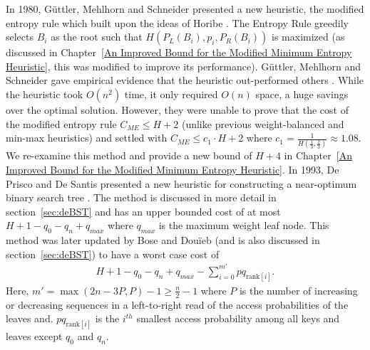 \documentclass[]{beamer}
\theoremstyle{plain}
\begin{document}
\begin{frame}
  In 1980, G{\"u}ttler, Mehlhorn and Schneider presented a new heuristic, the modified entropy rule \cite{guttler1980binary} which built upon the ideas of Horibe \cite{horibe1977improved}. The Entropy Rule greedily selects $B_i$ as the root such that $H(P_L(B_i), p_i, P_R(B_i))$ is maximized (as discussed in Chapter~\ref{An Improved Bound for the Modified Minimum Entropy Heuristic}, this was modified to improve its performance). G{\"u}ttler, Mehlhorn and Schneider gave empirical evidence that the heuristic out-performed others \cite{guttler1980binary}. While the heuristic took $O(n^2)$ time, it only required $O(n)$ space, a huge savings over the optimal solution. However, they were unable to prove that the cost of the modified entropy rule $C_{ME} \leq H+2$ (unlike previous weight-balanced and min-max heuristics) and settled with $C_{ME} \leq c_1\cdot H+2$ where $c_1=\frac{1}{H(\frac{1}{3}, \frac{2}{3})} \approx 1.08$. We re-examine this method and provide a new bound of $H+4$ in Chapter~\ref{An Improved Bound for the Modified Minimum Entropy Heuristic}. In 1993, De Prisco and De Santis presented a new heuristic for constructing a near-optimum binary search tree \cite{de1993binary}. The method is discussed in more detail in section~\ref{sec:deBST} and has an upper bounded cost of at most $H+1-q_0-q_n+q_{max}$ where $q_{max}$ is the maximum weight leaf node. This method was later updated by Bose and Dou\"{i}eb (and is also discussed in section~\ref{sec:deBST}) to have a worst case cost of 
\begin{align*}
H + 1 - q_0 - q_n + q_{max} - \sum_{i=0}^{m'} pq_{\text{rank}[i]}.
\end{align*}
Here, $m'=\max({2n-3P,P})-1 \geq \frac{n}{2} - 1$ where $P$ is the number of increasing or decreasing sequences in a left-to-right read of the access probabilities of the leaves and.  $pq_{\text{rank}[i]}$ is the $i^{th}$ smallest access probability among all keys and leaves except $q_0$ and $q_n$.
\end{frame}
\end{document}
